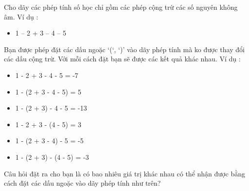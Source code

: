 Cho dãy các phép tính số học chỉ gồm các phép cộng trừ các số nguyên không âm. Ví dụ :  
\begin{itemize}
	\item     1 – 2 + 3 – 4 – 5   
\end{itemize}

   Bạn  được phép đặt các dấu ngoặc ‘(‘, ‘)’ vào dãy phép tính mà ko được thay  đổi các dấu cộng trừ. Với mỗi cách đặt bạn sẽ được các kết quả khác  nhau. Ví dụ :  
\begin{itemize}
	\item     1 - 2 + 3 - 4 - 5 = -7   
	\item     1 - (2 + 3 - 4 - 5) = 5   
	\item     1 - (2 + 3) - 4 - 5 = -13   
	\item     1 - 2 + 3 - (4 - 5) = 3   
	\item     1 - (2 + 3 - 4) - 5 = -5   
	\item     1 - (2 + 3) - (4 - 5) = -3   
\end{itemize}

   Câu hỏi đặt ra cho bạn là có bao nhiêu giá trị khác nhau có thể nhận  được bằng cách đặt các dấu ngoặc vào dãy phép tính như trên?